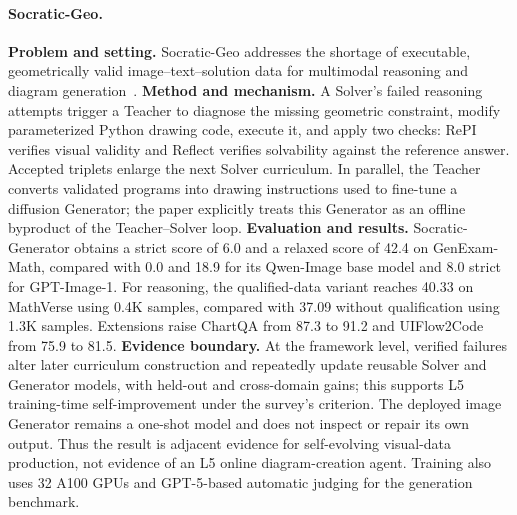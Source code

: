 \paragraph{Socratic-Geo.}
\textbf{Problem and setting.} Socratic-Geo addresses the shortage of executable, geometrically valid image--text--solution data for multimodal reasoning and diagram generation~\cite{avg260203414}. \textbf{Method and mechanism.} A Solver's failed reasoning attempts trigger a Teacher to diagnose the missing geometric constraint, modify parameterized Python drawing code, execute it, and apply two checks: RePI verifies visual validity and Reflect verifies solvability against the reference answer. Accepted triplets enlarge the next Solver curriculum. In parallel, the Teacher converts validated programs into drawing instructions used to fine-tune a diffusion Generator; the paper explicitly treats this Generator as an offline byproduct of the Teacher--Solver loop. \textbf{Evaluation and results.} Socratic-Generator obtains a strict score of 6.0 and a relaxed score of 42.4 on GenExam-Math, compared with 0.0 and 18.9 for its Qwen-Image base model and 8.0 strict for GPT-Image-1. For reasoning, the qualified-data variant reaches 40.33 on MathVerse using 0.4K samples, compared with 37.09 without qualification using 1.3K samples. Extensions raise ChartQA from 87.3 to 91.2 and UIFlow2Code from 75.9 to 81.5. \textbf{Evidence boundary.} At the framework level, verified failures alter later curriculum construction and repeatedly update reusable Solver and Generator models, with held-out and cross-domain gains; this supports L5 training-time self-improvement under the survey's criterion. The deployed image Generator remains a one-shot model and does not inspect or repair its own output. Thus the result is adjacent evidence for self-evolving visual-data production, not evidence of an L5 online diagram-creation agent. Training also uses 32 A100 GPUs and GPT-5-based automatic judging for the generation benchmark.

